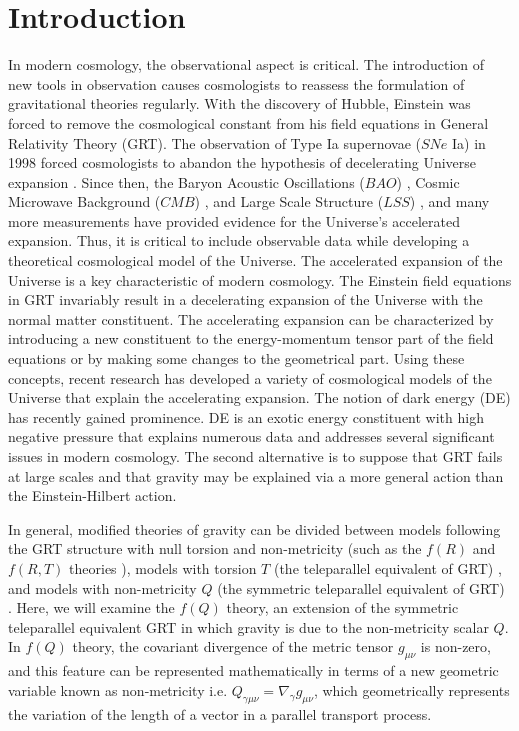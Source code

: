 \documentclass[prd,superscriptaddress,amsfonts,amssymb,amsmath,showpacs,twocolumn]{revtex4-2}
\begin{document}
\section{Introduction}
\label{sec1}

In modern cosmology, the observational aspect is critical. The introduction of new tools in observation causes cosmologists to reassess the formulation of gravitational theories regularly. With the discovery of Hubble, Einstein was forced to remove the cosmological constant from his field equations in General Relativity Theory (GRT). The observation of Type Ia supernovae ($SNe$ Ia) in 1998 forced cosmologists to abandon the hypothesis of decelerating Universe expansion \cite{Riess,Perlmutter}. Since then, the Baryon Acoustic Oscillations ($BAO$) \cite{D.J.,W.J.}, Cosmic Microwave Background ($CMB$) \cite{R.R.,Z.Y.}, and Large Scale Structure ($LSS$) \cite{T.Koivisto,S.F.}, and many more measurements have provided evidence for the Universe's accelerated expansion. Thus, it is critical to include observable data while developing a theoretical cosmological model of the Universe. The accelerated expansion of the Universe is a key characteristic of modern cosmology. The Einstein field equations in GRT invariably result in a decelerating expansion of the Universe with the normal matter constituent. The accelerating expansion can be characterized by introducing a new constituent to the energy-momentum tensor part of the field equations or by making some changes to the geometrical part. Using these concepts, recent research has developed a variety of cosmological models of the Universe that explain the accelerating expansion. The notion of dark energy (DE) has recently gained prominence. DE is an exotic energy constituent with high negative pressure that explains numerous data and addresses several significant issues in modern cosmology. The second alternative is to suppose that GRT fails at large scales and that gravity may be explained via a more general action than the Einstein-Hilbert action.

In general, modified theories of gravity can be divided between models following the GRT structure with null torsion and non-metricity (such as the $f(R)$ and $f(R,T)$ theories \cite{Capo/2008,Nojiri/2007, Harko/2011,Momeni/2015}), models with torsion $T$ (the teleparallel
equivalent of GRT) \cite{Capo/2011,Nunes/2016}, and models with non-metricity $Q$ (the symmetric teleparallel equivalent of GRT) \cite{Q0,Q1}. Here, we will examine the $f(Q)$ theory, an extension of the symmetric teleparallel equivalent GRT in which gravity is due to the non-metricity scalar $Q$. In $f(Q)$ theory, the covariant divergence of the metric tensor $g_{\mu \nu }$ is non-zero, and this feature can be represented mathematically in terms of a new geometric variable known as non-metricity i.e. $Q_{\gamma \mu \nu }=\nabla _{\gamma }g_{\mu \nu }$, which geometrically represents the variation of the length of a vector in a parallel transport process. 
\end{document}
